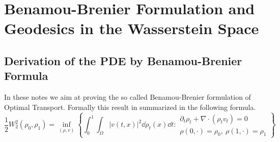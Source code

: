 \newpage
\chapter{Benamou-Brenier Formulation and Geodesics in the Wasserstein Space}

\section{Derivation of the PDE by Benamou-Brenier Formula}

In these notes we aim at proving the so called Benamou-Brenier formulation of Optimal Transport. Formally this result in summarized in the following formula.
\begin{equation}
\label{Benamou-Brenier_informal}
\tag{BB}
\frac{1}{2}W^2_2(\rho_0, \rho_1) 
= 
\inf_{(\rho, v)}
\left\{
\int_0^1\int_{\Omega}\left|v(t,x)\right|^2 \dd \rho_t(x)\dd t: 
\begin{array}{c}
\partial_t \rho_t + \nabla\cdot\left(\rho_t v_t\right) = 0\\
\rho(0,\cdot) = \rho_0, \ \rho(1, \cdot) = \rho_1 
\end{array}
\right\}
\end{equation}

